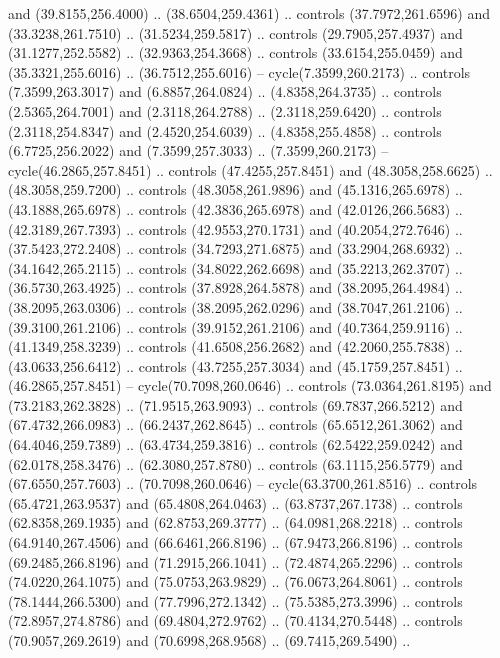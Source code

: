 \begin{scope}[cm={{1.25,0.0,0.0,-1.25,(0.0,743.43331)}}]
    and (39.8155,256.4000) .. (38.6504,259.4361) .. controls (37.7972,261.6596)
    and (33.3238,261.7510) .. (31.5234,259.5817) .. controls (29.7905,257.4937)
    and (31.1277,252.5582) .. (32.9363,254.3668) .. controls (33.6154,255.0459)
    and (35.3321,255.6016) .. (36.7512,255.6016) -- cycle(7.3599,260.2173) ..
    controls (7.3599,263.3017) and (6.8857,264.0824) .. (4.8358,264.3735) ..
    controls (2.5365,264.7001) and (2.3118,264.2788) .. (2.3118,259.6420) ..
    controls (2.3118,254.8347) and (2.4520,254.6039) .. (4.8358,255.4858) ..
    controls (6.7725,256.2022) and (7.3599,257.3033) .. (7.3599,260.2173) --
    cycle(46.2865,257.8451) .. controls (47.4255,257.8451) and (48.3058,258.6625)
    .. (48.3058,259.7200) .. controls (48.3058,261.9896) and (45.1316,265.6978) ..
    (43.1888,265.6978) .. controls (42.3836,265.6978) and (42.0126,266.5683) ..
    (42.3189,267.7393) .. controls (42.9553,270.1731) and (40.2054,272.7646) ..
    (37.5423,272.2408) .. controls (34.7293,271.6875) and (33.2904,268.6932) ..
    (34.1642,265.2115) .. controls (34.8022,262.6698) and (35.2213,262.3707) ..
    (36.5730,263.4925) .. controls (37.8928,264.5878) and (38.2095,264.4984) ..
    (38.2095,263.0306) .. controls (38.2095,262.0296) and (38.7047,261.2106) ..
    (39.3100,261.2106) .. controls (39.9152,261.2106) and (40.7364,259.9116) ..
    (41.1349,258.3239) .. controls (41.6508,256.2682) and (42.2060,255.7838) ..
    (43.0633,256.6412) .. controls (43.7255,257.3034) and (45.1759,257.8451) ..
    (46.2865,257.8451) -- cycle(70.7098,260.0646) .. controls (73.0364,261.8195)
    and (73.2183,262.3828) .. (71.9515,263.9093) .. controls (69.7837,266.5212)
    and (67.4732,266.0983) .. (66.2437,262.8645) .. controls (65.6512,261.3062)
    and (64.4046,259.7389) .. (63.4734,259.3816) .. controls (62.5422,259.0242)
    and (62.0178,258.3476) .. (62.3080,257.8780) .. controls (63.1115,256.5779)
    and (67.6550,257.7603) .. (70.7098,260.0646) -- cycle(63.3700,261.8516) ..
    controls (65.4721,263.9537) and (65.4808,264.0463) .. (63.8737,267.1738) ..
    controls (62.8358,269.1935) and (62.8753,269.3777) .. (64.0981,268.2218) ..
    controls (64.9140,267.4506) and (66.6461,266.8196) .. (67.9473,266.8196) ..
    controls (69.2485,266.8196) and (71.2915,266.1041) .. (72.4874,265.2296) ..
    controls (74.0220,264.1075) and (75.0753,263.9829) .. (76.0673,264.8061) ..
    controls (78.1444,266.5300) and (77.7996,272.1342) .. (75.5385,273.3996) ..
    controls (72.8957,274.8786) and (69.4804,272.9762) .. (70.4134,270.5448) ..
    controls (70.9057,269.2619) and (70.6998,268.9568) .. (69.7415,269.5490) ..

\end{scope}
